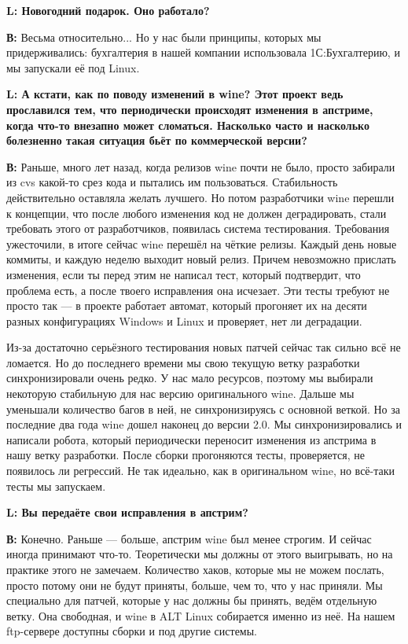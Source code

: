 \documentclass[10pt, a5paper]{article}
\begin{document}
{\noindent \bf L: Новогодний подарок. Оно работало?}

{\noindent \bf В:} Весьма относительно... Но у нас были принципы, которых мы придерживались:  бухгалтерия в нашей компании использовала 1С:Бухгалтерию, и мы запускали её под Linux.

{\noindent \bf L: А кстати, как по поводу изменений в wine? Этот проект ведь прославился тем, что периодически происходят изменения в апстриме, когда что-то внезапно может сломаться. Насколько часто и насколько болезненно такая ситуация бьёт по коммерческой версии? }

{\noindent \bf В:} Раньше, много лет назад, когда релизов wine почти не было, просто забирали из cvs какой-то срез кода и пытались им пользоваться. Стабильность действительно оставляла желать лучшего. Но потом разработчики wine перешли к концепции, что после любого изменения код не должен деградировать, стали требовать этого от разработчиков, появилась система тестирования. Требования ужесточили, в итоге сейчас wine перешёл на чёткие релизы. Каждый день новые коммиты, и каждую неделю выходит новый релиз. Причем невозможно прислать изменения, если ты перед этим не написал тест, который подтвердит, что  проблема есть, а после твоего исправления она исчезает. Эти тесты требуют не просто так --- в проекте работает автомат, который прогоняет их на десяти разных конфигурациях Windows и Linux и проверяет, нет ли деградации.

Из-за достаточно серьёзного тестирования новых патчей сейчас так сильно всё не ломается. Но до последнего времени мы свою текущую ветку разработки синхронизировали очень редко. У нас мало ресурсов, поэтому мы выбирали некоторую стабильную для нас версию оригинального wine. Дальше мы уменьшали количество багов в ней, не синхронизируясь с основной веткой. Но за последние два года wine дошел наконец до версии 2.0. Мы синхронизировались и написали робота, который периодически  переносит изменения из апстрима в нашу ветку разработки. После сборки прогоняются тесты, проверяется, не появилось ли регрессий. Не так идеально, как в оригинальном wine, но всё-таки тесты мы запускаем.

{\noindent \bf L: Вы передаёте свои  исправления в апстрим?}

{\noindent \bf В:} Конечно. Раньше --- больше, апстрим wine был менее строгим. И сейчас иногда принимают что-то. Теоретически мы должны от этого выигрывать, но на практике этого не замечаем. Количество хаков, которые мы не можем послать, просто потому они не будут приняты, больше, чем то, что у нас приняли. Мы специально для патчей, которые у нас должны бы принять, ведём отдельную ветку. Она свободная, и wine в ALT Linux собирается именно из неё. На нашем ftp-сервере доступны сборки и под другие системы.
\end{document}
